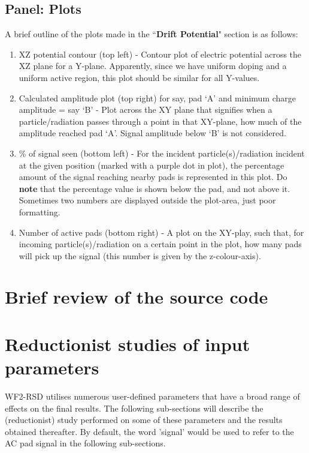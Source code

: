 \documentclass[11pt]{article}
\begin{document}
\subsection{Panel: Plots}
A brief outline of the plots made in the ``\textbf{Drift Potential}" section is as follows:
\begin{enumerate}
    \item XZ potential contour (top left) - Contour plot of electric potential across the XZ plane for a Y-plane. Apparently, since we have uniform doping and a uniform active region, this plot should be similar for all Y-values.
    \item Calculated amplitude plot (top right) for say, pad `A' and minimum charge amplitude = say `B' - Plot across the XY plane that signifies when a particle/radiation passes through a point in that XY-plane, how much of the amplitude reached pad `A'. Signal amplitude below `B' is not considered.
    \item \% of signal seen (bottom left) - For the incident particle(s)/radiation incident at the given position (marked with a purple dot in plot), the percentage amount of the signal reaching nearby pads is represented in this plot. Do \textbf{note} that the percentage value is shown below the pad, and not above it. Sometimes two numbers are displayed outside the plot-area, just poor formatting.
    \item Number of active pads (bottom right) - A plot on the XY-play, such that, for incoming particle(s)/radiation on a certain point in the plot, how many pads will pick up the signal (this number is given by the z-colour-axis).
\end{enumerate}

\section{Brief review of the source code}

\section{Reductionist studies of input parameters}\label{sec:full_analysis}
WF2-RSD utilises numerous user-defined parameters that have a broad range of effects on the final results. The following sub-sections will describe the (reductionist) study performed on some of these parameters and the results obtained thereafter. By default, the word 'signal' would be used to refer to the AC pad signal in the following sub-sections.
\end{document}
